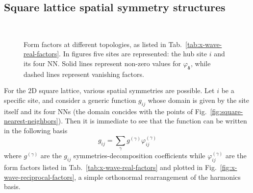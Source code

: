\subsection{Square lattice spatial symmetry structures}

\begin{figure}
	\centering
	\hspace{2em}
	\\[3em]
	\subfloat[$p_x$-wave.]{
		
		\label{subfig:px-wave-correlator}
	}
	\hspace{2em}
	\subfloat[$p_y$-wave.]{
		
		\label{subfig:py-wave-correlator}
	}
	\hspace{2em}
	\subfloat[$d_{x^2-y^2}$-wave.]{
		
		\label{subfig:d-wave-correlator}
	}
	\caption{Form factors at different topologies, as listed in Tab.~\ref{tab:x-wave-real-factors}. In figures five sites are represented: the hub site $i$ and its four NN. Solid lines represent non-zero values for $\varphi_{\bm{\delta}}$, while dashed lines represent vanishing factors.}
	\label{fig:x-wave-real-factors}
\end{figure}

For the $2$D square lattice, various spatial symmetries are possible. Let $i$ be a specific site, and consider a generic function $g_{ij}$ whose domain is given by the site itself and its four NNs (the domain concides with the points of Fig.~\ref{fig:square-nearest-neighbors}). Then it is immediate to see that the function can be written in the following basis
\[
	g_{ij} = \sum_\gamma g^{(\gamma)} \varphi_{ij}^{(\gamma)}
\]
where $g^{(\gamma)}$ are the $g_{ij}$ symmetries-decomposition coefficients while $\varphi_{ij}^{(\gamma)}$ are the form factors listed in Tab.~\ref{tab:x-wave-real-factors} and plotted in Fig.~\ref{fig:x-wave-reciprocal-factors}, a simple orthonormal rearrangement of the harmonics basis.

